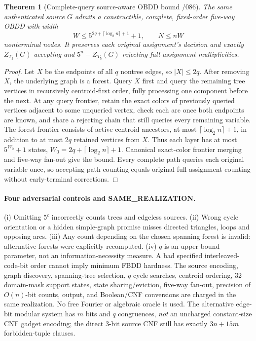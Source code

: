 \documentclass[11pt]{article}
\newtheorem{theorem}{Theorem}
\begin{document}
\begin{theorem}[Complete-query source-aware OBDD bound /086]
The same authenticated source $G$ admits a constructible, complete,
fixed-order five-way OBDD with width
\[
 W\le 5^{2q+\lceil\log_2n\rceil+1}+1,\qquad
 N\le nW
\]
nonterminal nodes. It preserves each original assignment's decision
and exactly $Z_{T_5}(G)$ accepting and $5^n-Z_{T_5}(G)$ rejecting
full-assignment multiplicities.
\end{theorem}
\begin{proof}
Let $X$ be the endpoints of all $q$ nontree edges, so $|X|\le2q$.
After removing $X$, the underlying graph is a forest.
Query $X$ first and query the remaining tree vertices in
recursively centroid-first order, fully processing one component
before the next. At any query frontier, retain the exact colors
of previously queried vertices adjacent to some unqueried vertex,
check each arc once both endpoints are known, and share a rejecting
chain that still queries every remaining variable.
The forest frontier consists of active centroid ancestors, at most
$\lceil\log_2n\rceil+1$, in addition to at most $2q$ retained
vertices from $X$. Thus each layer has at most $5^{W_0}+1$
states, $W_0=2q+\lceil\log_2n\rceil+1$.
Canonical exact-color frontier merging and five-way fan-out
give the bound. Every complete path queries each original variable
once, so accepting-path counting equals original full-assignment
counting without early-terminal corrections.
\end{proof}

\paragraph{Four adversarial controls and SAME\_REALIZATION.}
(i) Omitting $5^c$ incorrectly counts trees and edgeless sources.
(ii) Wrong cycle orientation or a hidden simple-graph promise misses
directed triangles, loops and opposing arcs.
(iii) Any count depending on the chosen spanning forest is invalid:
alternative forests were explicitly recomputed.
(iv) $q$ is an upper-bound parameter, not an information-necessity
measure. A bad specified interleaved-code-bit order cannot imply
minimum FBDD hardness. The source encoding, graph discovery,
spanning-tree selection, $q$ cycle searches, centroid ordering,
32 domain-mask support states, state sharing/eviction, five-way
fan-out, precision of $O(n)$-bit counts, output, and Boolean/CNF
conversions are charged in the same realization. No free Fourier
or algebraic oracle is used. The alternative edge-bit modular system
has $m$ bits and $q$ congruences, \emph{not} an uncharged
constant-size CNF gadget encoding; the direct 3-bit source CNF still
has exactly $3n+15m$ forbidden-tuple clauses.
\end{document}
